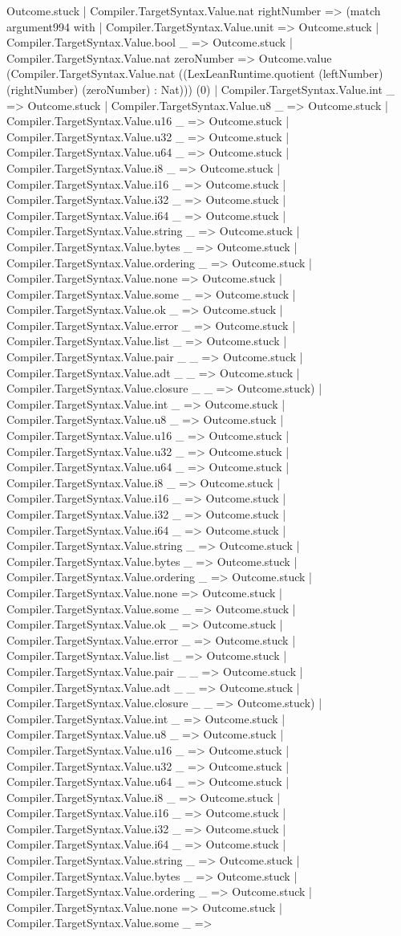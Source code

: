 \documentclass[11pt]{article}
\begin{document}
Outcome.stuck | Compiler.TargetSyntax.Value.nat rightNumber => (match argument994 with | Compiler.TargetSyntax.Value.unit => Outcome.stuck | Compiler.TargetSyntax.Value.bool \_ => Outcome.stuck | Compiler.TargetSyntax.Value.nat zeroNumber => Outcome.value (Compiler.TargetSyntax.Value.nat ((LexLeanRuntime.quotient (leftNumber) (rightNumber) (zeroNumber) : Nat))) (0) | Compiler.TargetSyntax.Value.int \_ => Outcome.stuck | Compiler.TargetSyntax.Value.u8 \_ => Outcome.stuck | Compiler.TargetSyntax.Value.u16 \_ => Outcome.stuck | Compiler.TargetSyntax.Value.u32 \_ => Outcome.stuck | Compiler.TargetSyntax.Value.u64 \_ => Outcome.stuck | Compiler.TargetSyntax.Value.i8 \_ => Outcome.stuck | Compiler.TargetSyntax.Value.i16 \_ => Outcome.stuck | Compiler.TargetSyntax.Value.i32 \_ => Outcome.stuck | Compiler.TargetSyntax.Value.i64 \_ => Outcome.stuck | Compiler.TargetSyntax.Value.string \_ => Outcome.stuck | Compiler.TargetSyntax.Value.bytes \_ => Outcome.stuck | Compiler.TargetSyntax.Value.ordering \_ => Outcome.stuck | Compiler.TargetSyntax.Value.none => Outcome.stuck | Compiler.TargetSyntax.Value.some \_ => Outcome.stuck | Compiler.TargetSyntax.Value.ok \_ => Outcome.stuck | Compiler.TargetSyntax.Value.error \_ => Outcome.stuck | Compiler.TargetSyntax.Value.list \_ => Outcome.stuck | Compiler.TargetSyntax.Value.pair \_ \_ => Outcome.stuck | Compiler.TargetSyntax.Value.adt \_ \_ => Outcome.stuck | Compiler.TargetSyntax.Value.closure \_ \_ => Outcome.stuck) | Compiler.TargetSyntax.Value.int \_ => Outcome.stuck | Compiler.TargetSyntax.Value.u8 \_ => Outcome.stuck | Compiler.TargetSyntax.Value.u16 \_ => Outcome.stuck | Compiler.TargetSyntax.Value.u32 \_ => Outcome.stuck | Compiler.TargetSyntax.Value.u64 \_ => Outcome.stuck | Compiler.TargetSyntax.Value.i8 \_ => Outcome.stuck | Compiler.TargetSyntax.Value.i16 \_ => Outcome.stuck | Compiler.TargetSyntax.Value.i32 \_ => Outcome.stuck | Compiler.TargetSyntax.Value.i64 \_ => Outcome.stuck | Compiler.TargetSyntax.Value.string \_ => Outcome.stuck | Compiler.TargetSyntax.Value.bytes \_ => Outcome.stuck | Compiler.TargetSyntax.Value.ordering \_ => Outcome.stuck | Compiler.TargetSyntax.Value.none => Outcome.stuck | Compiler.TargetSyntax.Value.some \_ => Outcome.stuck | Compiler.TargetSyntax.Value.ok \_ => Outcome.stuck | Compiler.TargetSyntax.Value.error \_ => Outcome.stuck | Compiler.TargetSyntax.Value.list \_ => Outcome.stuck | Compiler.TargetSyntax.Value.pair \_ \_ => Outcome.stuck | Compiler.TargetSyntax.Value.adt \_ \_ => Outcome.stuck | Compiler.TargetSyntax.Value.closure \_ \_ => Outcome.stuck) | Compiler.TargetSyntax.Value.int \_ => Outcome.stuck | Compiler.TargetSyntax.Value.u8 \_ => Outcome.stuck | Compiler.TargetSyntax.Value.u16 \_ => Outcome.stuck | Compiler.TargetSyntax.Value.u32 \_ => Outcome.stuck | Compiler.TargetSyntax.Value.u64 \_ => Outcome.stuck | Compiler.TargetSyntax.Value.i8 \_ => Outcome.stuck | Compiler.TargetSyntax.Value.i16 \_ => Outcome.stuck | Compiler.TargetSyntax.Value.i32 \_ => Outcome.stuck | Compiler.TargetSyntax.Value.i64 \_ => Outcome.stuck | Compiler.TargetSyntax.Value.string \_ => Outcome.stuck | Compiler.TargetSyntax.Value.bytes \_ => Outcome.stuck | Compiler.TargetSyntax.Value.ordering \_ => Outcome.stuck | Compiler.TargetSyntax.Value.none => Outcome.stuck | Compiler.TargetSyntax.Value.some \_ => 
\end{document}
